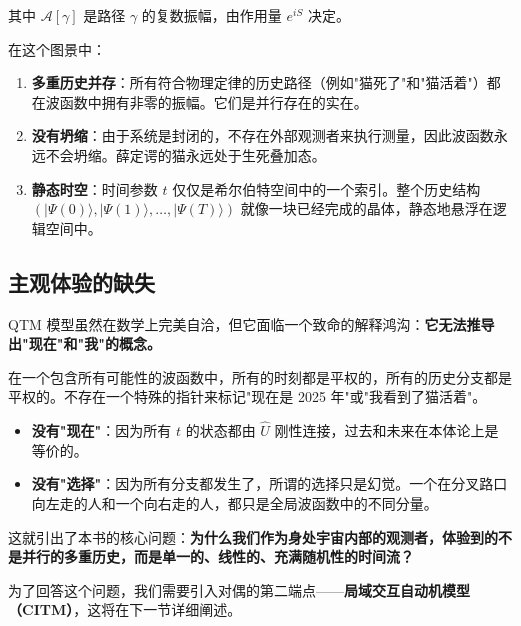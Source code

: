 其中 $\mathcal{A}[\gamma]$ 是路径 $\gamma$ 的复数振幅，由作用量 $e^{iS}$ 决定。

在这个图景中：

\begin{enumerate}
\item \textbf{多重历史并存}：所有符合物理定律的历史路径（例如"猫死了"和"猫活着"）都在波函数中拥有非零的振幅。它们是并行存在的实在。

\item \textbf{没有坍缩}：由于系统是封闭的，不存在外部观测者来执行测量，因此波函数永远不会坍缩。薛定谔的猫永远处于生死叠加态。

\item \textbf{静态时空}：时间参数 $t$ 仅仅是希尔伯特空间中的一个索引。整个历史结构 $(|\Psi(0)\rangle, |\Psi(1)\rangle, \dots, |\Psi(T)\rangle)$ 就像一块已经完成的晶体，静态地悬浮在逻辑空间中。
\end{enumerate}

\subsection{主观体验的缺失}

QTM 模型虽然在数学上完美自洽，但它面临一个致命的解释鸿沟：\textbf{它无法推导出"现在"和"我"的概念。}

在一个包含所有可能性的波函数中，所有的时刻都是平权的，所有的历史分支都是平权的。不存在一个特殊的指针来标记"现在是 2025 年"或"我看到了猫活着"。

\begin{itemize}
\item \textbf{没有"现在"}：因为所有 $t$ 的状态都由 $\hat{U}$ 刚性连接，过去和未来在本体论上是等价的。

\item \textbf{没有"选择"}：因为所有分支都发生了，所谓的选择只是幻觉。一个在分叉路口向左走的人和一个向右走的人，都只是全局波函数中的不同分量。
\end{itemize}

这就引出了本书的核心问题：\textbf{为什么我们作为身处宇宙内部的观测者，体验到的不是并行的多重历史，而是单一的、线性的、充满随机性的时间流？}

为了回答这个问题，我们需要引入对偶的第二端点——\textbf{局域交互自动机模型（CITM）}，这将在下一节详细阐述。
